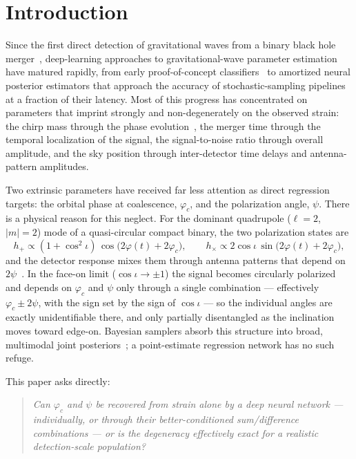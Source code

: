 \documentclass[11pt]{article}
\begin{document}
\tableofcontents

\section{Introduction}
\label{sec:phicpsi:intro}

Since the first direct detection of gravitational waves from a binary black hole merger~\citep{abbott2016gw150914}, deep-learning approaches to gravitational-wave parameter estimation have matured rapidly, from early proof-of-concept classifiers~\citep{george2018deep} to amortized neural posterior estimators that approach the accuracy of stochastic-sampling pipelines~\citep{gabbard2022vitamin,dax2021dingo} at a fraction of their latency.
Most of this progress has concentrated on parameters that imprint strongly and non-degenerately on the observed strain: the chirp mass through the phase evolution~\citep{cutler1994gw}, the merger time through the temporal localization of the signal, the signal-to-noise ratio through overall amplitude, and the sky position through inter-detector time delays and antenna-pattern amplitudes.

Two extrinsic parameters have received far less attention as direct regression targets: the orbital phase at coalescence, $\varphi_c$, and the polarization angle, $\psi$.
There is a physical reason for this neglect.
For the dominant quadrupole ($\ell=2$, $|m|=2$) mode of a quasi-circular compact binary, the two polarization states are
\begin{equation}
    h_+ \propto (1+\cos^2\iota)\,\cos\!\bigl(2\varphi(t)+2\varphi_c\bigr),
    \qquad
    h_\times \propto 2\cos\iota\,\sin\!\bigl(2\varphi(t)+2\varphi_c\bigr),
\end{equation}
and the detector response mixes them through antenna patterns that depend on $2\psi$~\citep{cutler1994gw,sathyaprakash2009physics}.
In the face-on limit ($\cos\iota \to \pm 1$) the signal becomes circularly polarized and depends on $\varphi_c$ and $\psi$ only through a single combination --- effectively $\varphi_c \pm 2\psi$, with the sign set by the sign of $\cos\iota$ --- so the individual angles are exactly unidentifiable there, and only partially disentangled as the inclination moves toward edge-on.
Bayesian samplers absorb this structure into broad, multimodal joint posteriors~\citep{veitch2015lalinference,ashton2019bilby}; a point-estimate regression network has no such refuge.

This paper asks directly:
\begin{quote}
\itshape Can $\varphi_c$ and $\psi$ be recovered from strain alone by a deep neural network --- individually, or through their better-conditioned sum/difference combinations --- or is the degeneracy effectively exact for a realistic detection-scale population?
\end{quote}
\end{document}
